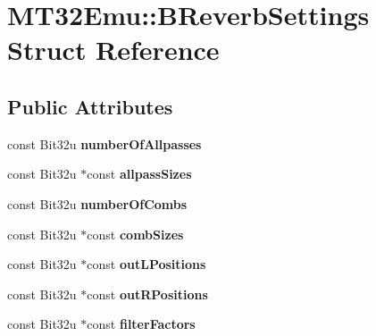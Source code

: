 \hypertarget{structMT32Emu_1_1BReverbSettings}{\section{M\-T32\-Emu\-:\-:B\-Reverb\-Settings Struct Reference}
\label{structMT32Emu_1_1BReverbSettings}
}
\subsection*{Public Attributes}
\begin{DoxyCompactItemize}
\item 
\hypertarget{structMT32Emu_1_1BReverbSettings_a21773838b12169d909fa94c0324654c6}{const Bit32u {\bfseries number\-Of\-Allpasses}}\label{structMT32Emu_1_1BReverbSettings_a21773838b12169d909fa94c0324654c6}

\item 
\hypertarget{structMT32Emu_1_1BReverbSettings_aeb6f59ff13b351ea0e6d7be0185850ff}{const Bit32u $\ast$const {\bfseries allpass\-Sizes}}\label{structMT32Emu_1_1BReverbSettings_aeb6f59ff13b351ea0e6d7be0185850ff}

\item 
\hypertarget{structMT32Emu_1_1BReverbSettings_acf8c4ddadbb8d80aed4ca91f1ba08d98}{const Bit32u {\bfseries number\-Of\-Combs}}\label{structMT32Emu_1_1BReverbSettings_acf8c4ddadbb8d80aed4ca91f1ba08d98}

\item 
\hypertarget{structMT32Emu_1_1BReverbSettings_af76c18d2fb394f483e28892cb6b6435a}{const Bit32u $\ast$const {\bfseries comb\-Sizes}}\label{structMT32Emu_1_1BReverbSettings_af76c18d2fb394f483e28892cb6b6435a}

\item 
\hypertarget{structMT32Emu_1_1BReverbSettings_a3850bda62199a68aed6087ed4e56e293}{const Bit32u $\ast$const {\bfseries out\-L\-Positions}}\label{structMT32Emu_1_1BReverbSettings_a3850bda62199a68aed6087ed4e56e293}

\item 
\hypertarget{structMT32Emu_1_1BReverbSettings_a0323eba12c08ce5269789038968f7706}{const Bit32u $\ast$const {\bfseries out\-R\-Positions}}\label{structMT32Emu_1_1BReverbSettings_a0323eba12c08ce5269789038968f7706}

\item 
\hypertarget{structMT32Emu_1_1BReverbSettings_a8953715288bb0cba12698e296d3ecb87}{const Bit32u $\ast$const {\bfseries filter\-Factors}}\label{structMT32Emu_1_1BReverbSettings_a8953715288bb0cba12698e296d3ecb87}


\end{DoxyCompactItemize}
